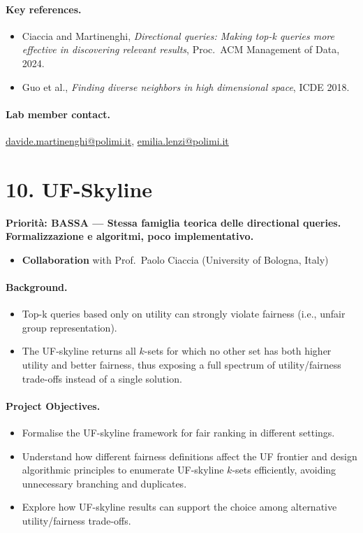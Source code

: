 \documentclass[a4paper,11pt]{article}
\newcommand{\priorita}[1]{%
  \par\smallskip\noindent\textbf{Priorit\`a: #1}\par\smallskip
}
\begin{document}
\paragraph{Key references.}
\begin{itemize}[nosep]
  \item Ciaccia and Martinenghi, \emph{Directional queries: Making top-k queries more effective in discovering relevant results}, Proc.\ ACM Management of Data, 2024.
  \item Guo et al., \emph{Finding diverse neighbors in high dimensional space}, ICDE 2018.
\end{itemize}

\paragraph{Lab member contact.}
\url{davide.martinenghi@polimi.it}, \url{emilia.lenzi@polimi.it}


\section{10. UF-Skyline}

\priorita{BASSA --- Stessa famiglia teorica delle directional queries. Formalizzazione e algoritmi, poco implementativo.}

\begin{itemize}[nosep]
  \item \textbf{Collaboration} with Prof.\ Paolo Ciaccia (University of Bologna, Italy)
\end{itemize}

\paragraph{Background.}
\begin{itemize}[nosep]
  \item Top-k queries based only on utility can strongly violate fairness (i.e., unfair group representation).
  \item The UF-skyline returns all $k$-sets for which no other set has both higher utility and better fairness, thus exposing a full spectrum of utility/fairness trade-offs instead of a single solution.
\end{itemize}

\paragraph{Project Objectives.}
\begin{itemize}[nosep]
  \item Formalise the UF-skyline framework for fair ranking in different settings.
  \item Understand how different fairness definitions affect the UF frontier and design algorithmic principles to enumerate UF-skyline $k$-sets efficiently, avoiding unnecessary branching and duplicates.
  \item Explore how UF-skyline results can support the choice among alternative utility/fairness trade-offs.
\end{itemize}
\end{document}
